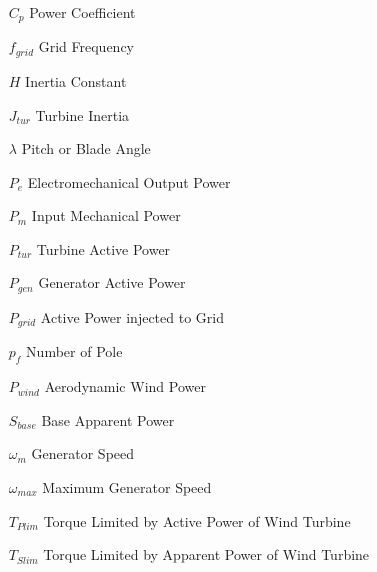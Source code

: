 
\begin{theglossary}{}
	
	\begin{itemize}[leftmargin=4.5em,align=parleft,labelsep=1cm]
		
		\item[$C_{p}$] 			Power Coefficient
		\item[$f_{grid}$] 		Grid Frequency
		\item[$H$] 				Inertia Constant
		\item[$J_{tur}$] 		Turbine Inertia
		\item[$\lambda$] 		Pitch or Blade Angle
		\item[$P_{e}$] 			Electromechanical Output Power
		\item[$P_{m}$] 			Input Mechanical Power
		\item[$P_{tur}$] 		Turbine Active Power
		\item[$P_{gen}$] 		Generator Active Power
		\item[$P_{grid}$] 		Active Power injected to Grid
		\item[$p_{f}$] 			Number of Pole
		\item[$P_{wind}$] 		Aerodynamic Wind Power
		\item[$S_{base}$] 		Base Apparent Power
		\item[$\omega_{m}$] 	Generator Speed
		\item[$\omega_{max}$] 	Maximum Generator Speed
		\item[$T_{Plim}$]		Torque Limited by Active Power of Wind Turbine
		\item[$T_{Slim}$] 		Torque Limited by Apparent Power of Wind Turbine
	\end{itemize}
	
\end{theglossary}